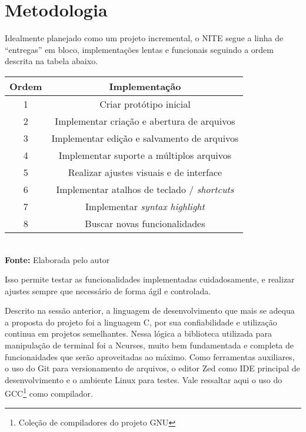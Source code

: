 \chapter{Metodologia}
\label{cap:03}


Idealmente planejado como um projeto incremental, o NITE segue a linha de ``entregas'' em bloco,
implementações lentas e funcionais seguindo a ordem descrita na tabela abaixo.

\FloatBarrier
\begin{table}[!htbp]
	\centering
	\begin{tabular}{ c | c }
		\hline
		\textbf{Ordem} & \textbf{Implementação}                                     \\ \hline
		1  & Criar protótipo inicial                                                \\ \hline
		2  & Implementar criação e abertura de arquivos                             \\ \hline
		3  & Implementar edição e salvamento de arquivos                            \\ \hline
		4  & Implementar suporte a múltiplos arquivos                               \\ \hline
		5  & Realizar ajustes visuais e de interface                                \\ \hline
		6  & Implementar atalhos de teclado / \textit{shortcuts}                    \\ \hline
		7  & Implementar \textit{syntax highlight}\footnotemark                     \\ \hline
		8  & Buscar novas funcionalidades                                           \\ \hline
	\end{tabular}
	\\ \vspace{0.2cm}
	\textbf{Fonte:} Elaborada pelo autor
	\label{tab:implementacoes}
\end{table}
\FloatBarrier

Isso permite testar as funcionalidades implementadas cuidadosamente, e realizar ajustes
sempre que necessário de forma ágil e controlada.

Descrito na sessão anterior, a linguagem de desenvolvimento que mais se adequa a proposta do projeto
foi a linguagem C, por sua confiabilidade e utilização continua em projetos semelhantes. Nessa lógica
a biblioteca utilizada para manipulação de terminal foi a Ncurses, muito bem fundamentada e completa
de funcionaidades que serão aproveitadas ao máximo. Como ferramentas auxiliares, o uso do Git para
versionamento de arquivos, o editor Zed como IDE principal de desenvolvimento e o ambiente Linux para
testes. Vale ressaltar aqui o uso do GCC\footnote{Coleção de compiladores do projeto GNU} como compilador.

